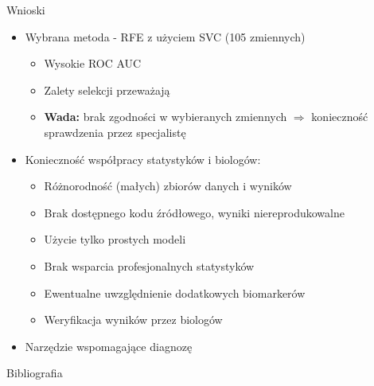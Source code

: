 \documentclass[11pt]{beamer}
\newcommand{\backupbegin}{
   \newcounter{finalframe}
   \setcounter{finalframe}{\value{framenumber}}
}
\newcommand{\backupend}{
   \setcounter{framenumber}{\value{finalframe}}
}
\begin{document}
\begin{frame}{Wnioski}
\begin{itemize}
\item Wybrana metoda - RFE z użyciem SVC (105 zmiennych)
    \begin{itemize}
        \item Wysokie ROC AUC
        \item Zalety selekcji przeważają
        \item \textbf{Wada:} brak zgodności w wybieranych zmiennych $\Rightarrow$ konieczność sprawdzenia przez specjalistę
    \end{itemize}
\item Konieczność współpracy statystyków i biologów:
\begin{itemize}
    \item Różnorodność (małych) zbiorów danych i wyników
    \item Brak dostępnego kodu źródłowego, wyniki niereprodukowalne
    \item Użycie tylko prostych modeli
    \item Brak wsparcia profesjonalnych statystyków
    \item Ewentualne uwzględnienie dodatkowych biomarkerów
    \item Weryfikacja wyników przez biologów
\end{itemize}
\item Narzędzie wspomagające diagnozę
\end{itemize}
\end{frame}


\appendix
\backupbegin
\begin{frame}[allowframebreaks]{Bibliografia}

{\tiny
\nocite{*}


}%
\end{frame}



\backupend
\end{document}
